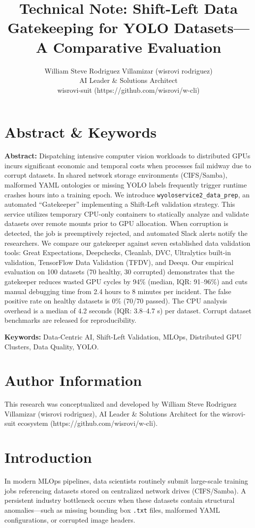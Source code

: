 \documentclass[10pt,twocolumn,letterpaper]{article}
\title{Technical Note: Shift-Left Data Gatekeeping for YOLO Datasets---A Comparative Evaluation}
\author{William Steve Rodriguez Villamizar (wisrovi rodriguez)\\AI Leader \& Solutions Architect\\wisrovi-suit (https://github.com/wisrovi/w-cli)}
\date{}
\begin{document}
\maketitle

\section{Abstract \& Keywords}
\textbf{Abstract:} Dispatching intensive computer vision workloads to distributed GPUs incurs significant economic and temporal costs when processes fail midway due to corrupt datasets. In shared network storage environments (CIFS/Samba), malformed YAML ontologies or missing YOLO labels frequently trigger runtime crashes hours into a training epoch. We introduce \texttt{wyoloservice2\_data\_prep}, an automated ``Gatekeeper'' implementing a Shift-Left validation strategy. This service utilizes temporary CPU-only containers to statically analyze and validate datasets over remote mounts prior to GPU allocation. When corruption is detected, the job is preemptively rejected, and automated Slack alerts notify the researchers. We compare our gatekeeper against seven established data validation tools: Great Expectations, Deepchecks, Cleanlab, DVC, Ultralytics built-in validation, TensorFlow Data Validation (TFDV), and Deequ. Our empirical evaluation on 100 datasets (70 healthy, 30 corrupted) demonstrates that the gatekeeper reduces wasted GPU cycles by 94\% (median, IQR: 91--96\%) and cuts manual debugging time from 2.4 hours to 8 minutes per incident. The false positive rate on healthy datasets is 0\% (70/70 passed). The CPU analysis overhead is a median of 4.2 seconds (IQR: 3.8--4.7 s) per dataset. Corrupt dataset benchmarks are released for reproducibility.

\textbf{Keywords:} Data-Centric AI, Shift-Left Validation, MLOps, Distributed GPU Clusters, Data Quality, YOLO.

\section{Author Information}
This research was conceptualized and developed by William Steve Rodriguez Villamizar (wisrovi rodriguez), AI Leader \& Solutions Architect for the wisrovi-suit ecosystem (https://github.com/wisrovi/w-cli).

\section{Introduction}
In modern MLOps pipelines, data scientists routinely submit large-scale training jobs referencing datasets stored on centralized network drives (CIFS/Samba). A persistent industry bottleneck occurs when these datasets contain structural anomalies---such as missing bounding box \texttt{.txt} files, malformed YAML configurations, or corrupted image headers.
\end{document}
